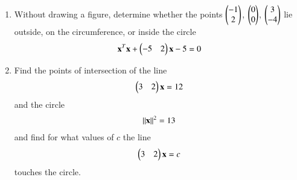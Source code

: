 \renewcommand{\theequation}{\theenumi}
\begin{enumerate}[label=\arabic*.,ref=\thesubsection.\theenumi]
\item Without drawing a figure, determine whether the points $\begin{pmatrix}-1\\2\end{pmatrix}$, $\begin{pmatrix}0\\0\end{pmatrix}$, $\begin{pmatrix}3\\-4\end{pmatrix}$ lie outside, on the circumference, or inside the circle
\begin{align}
\mathbf{x}^T\mathbf{x}+\begin{pmatrix}-5 & 2\end{pmatrix}\mathbf{x}-5 = 0
\end{align}
\solution

\item Find the points of intersection of the line 
\begin{align}
\begin{pmatrix}3 &2\end{pmatrix}\mathbf{x}=12
\end{align}
and the circle 
\begin{align}
\left\lVert\mathbf{x}\right\rVert^2=13
\end{align}
 and find for what values of $c$ the line 
\begin{align}
\begin{pmatrix}3 &2\end{pmatrix}\mathbf{x}=c
\end{align}
touches the circle.


\end{enumerate}
